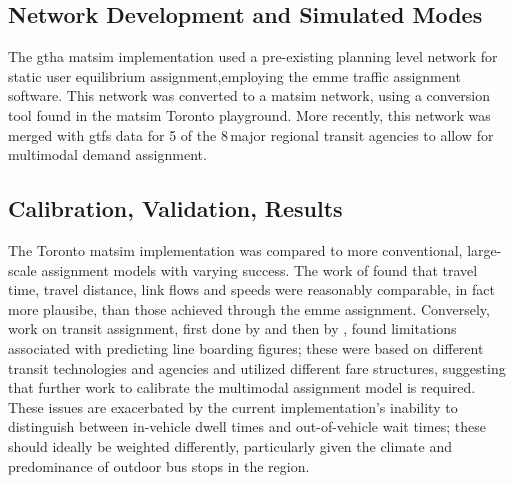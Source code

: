 \subsection{Network Development and Simulated Modes}  
The \gls{gtha} \gls{matsim} implementation used a pre-existing planning level network for static user equilibrium assignment,employing the \gls{emme} traffic assignment software. This network was converted to a \gls{matsim} network, using a conversion tool found in the \gls{matsim} Toronto playground. More recently, this network was merged with \gls{gtfs} data for 5 of the 8\,major regional transit agencies to allow for \gls{multimodal} demand assignment.  

\subsection{Calibration, Validation, Results}
The Toronto \gls{matsim} implementation was compared to more conventional, large-scale assignment models with varying success. The work of \citet[][]{GaoWEtAl_TRR_2010} found that travel time, travel distance, link flows and speeds were reasonably comparable,  in fact more plausibe, than those achieved through the \gls{emme} assignment. Conversely, work on transit assignment, first done by \citet[][]{Kucirek_MastersThesis_2012} and then by \citet[][]{WeissEtAl_CJCE_2012}, found limitations associated with predicting line boarding figures; these were based on different transit technologies and agencies and utilized different fare structures, suggesting that further work to calibrate the \gls{multimodal} assignment model is required. These issues are exacerbated by the current implementation's inability to distinguish between in-vehicle dwell times and out-of-vehicle wait times; these should ideally be weighted differently, particularly given the climate and predominance of outdoor bus stops in the region. 


